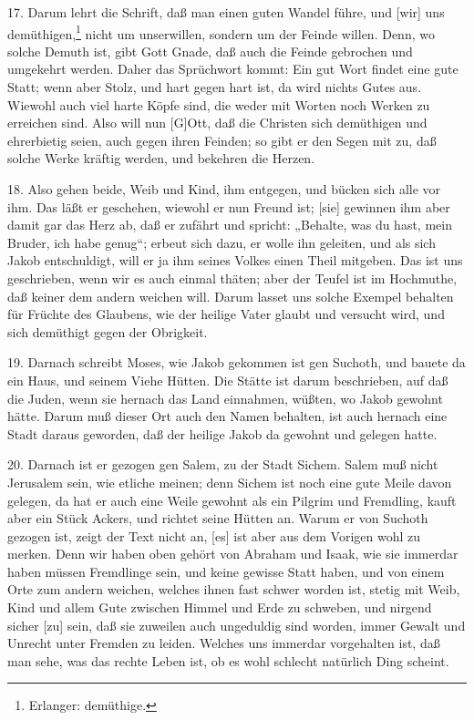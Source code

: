 17. Darum lehrt die Schrift, daß man einen guten Wandel führe, und [wir] uns demüthigen,\footnote{Erlanger: demüthige.} nicht um unserwillen, sondern um der Feinde willen. Denn, wo solche Demuth ist, gibt Gott Gnade, daß auch die Feinde gebrochen und umgekehrt werden. Daher das Sprüchwort kommt: Ein gut Wort findet eine gute Statt; wenn aber Stolz, und hart gegen hart ist, da wird nichts Gutes aus. Wiewohl auch viel harte Köpfe sind, die weder mit Worten noch Werken zu erreichen sind. Also will nun [G]Ott, daß die Christen sich demüthigen und ehrerbietig seien, auch gegen ihren Feinden; so gibt er den Segen mit zu, daß solche Werke kräftig werden, und bekehren die Herzen.

18. Also gehen beide, Weib und Kind, ihm entgegen, und bücken sich alle vor ihm. Das läßt er geschehen, wiewohl er nun Freund ist; [sie] gewinnen ihm aber damit gar das Herz ab, daß er zufährt und spricht: „Behalte, was du hast, mein Bruder, ich habe genug“; erbeut sich dazu, er wolle ihn geleiten, und als sich Jakob entschuldigt, will er ja ihm seines Volkes einen Theil mitgeben. Das ist uns geschrieben, wenn wir es auch einmal thäten; aber der Teufel ist im Hochmuthe, daß keiner dem andern weichen will. Darum lasset uns solche Exempel behalten für Früchte des Glaubens, wie der heilige Vater glaubt und versucht wird, und sich demüthigt gegen der Obrigkeit.

19. Darnach schreibt Moses, wie Jakob gekommen ist gen Suchoth, und bauete da ein Haus, und seinem Viehe Hütten. Die Stätte ist darum beschrieben, auf daß die Juden, wenn sie hernach das Land einnahmen, wüßten, wo Jakob gewohnt hätte. Darum muß dieser Ort auch den Namen behalten, ist auch hernach eine Stadt daraus geworden, daß der heilige Jakob da gewohnt und gelegen hatte.

20. Darnach ist er gezogen gen Salem, zu der Stadt Sichem. Salem muß nicht Jerusalem sein, wie etliche meinen; denn Sichem ist noch eine gute Meile davon gelegen, da hat er auch eine Weile gewohnt als ein Pilgrim und Fremdling, kauft aber ein Stück Ackers, und richtet seine Hütten an. Warum er von Suchoth gezogen ist, zeigt der Text nicht an, [es] ist aber
aus dem Vorigen wohl zu merken. Denn wir haben oben gehört von Abraham und Isaak, wie sie immerdar haben müssen Fremdlinge sein, und keine gewisse Statt haben, und von einem Orte zum andern weichen, welches ihnen fast schwer worden ist, stetig mit Weib, Kind und allem Gute zwischen Himmel und Erde zu schweben, und nirgend sicher [zu] sein, daß sie zuweilen auch ungeduldig sind worden, immer Gewalt und Unrecht unter Fremden zu leiden. Welches uns immerdar vorgehalten ist, daß man sehe, was das rechte Leben ist, ob es wohl schlecht natürlich Ding scheint.

